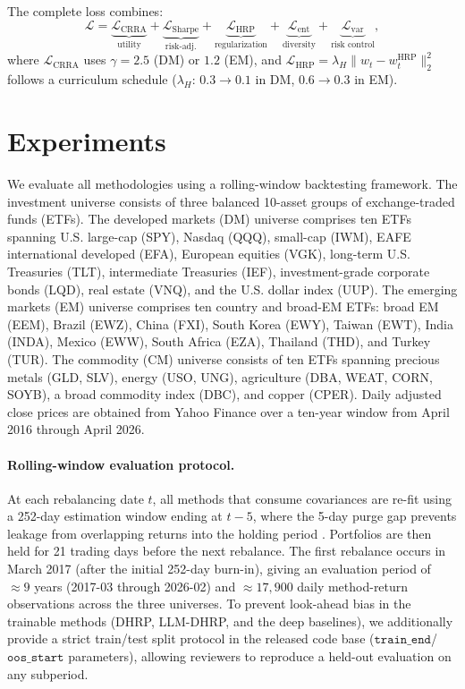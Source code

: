 \documentclass{article}
\begin{document}
The complete loss combines:
\begin{equation}
\mathcal{L} = \underbrace{\mathcal{L}_{\text{CRRA}}}_{\text{utility}} + \underbrace{\mathcal{L}_{\text{Sharpe}}}_{\text{risk-adj.}} + \underbrace{\mathcal{L}_{\text{HRP}}}_{\text{regularization}} + \underbrace{\mathcal{L}_{\text{ent}}}_{\text{diversity}} + \underbrace{\mathcal{L}_{\text{var}}}_{\text{risk control}},
\end{equation}
where $\mathcal{L}_{\text{CRRA}}$ uses $\gamma = 2.5$ (DM) or $1.2$ (EM), and $\mathcal{L}_{\text{HRP}} = \lambda_H \|w_t - w_t^{\text{HRP}}\|_2^2$ follows a curriculum schedule ($\lambda_H$: $0.3 \to 0.1$ in DM, $0.6 \to 0.3$ in EM).

\section{Experiments}

We evaluate all methodologies using a rolling-window backtesting framework. The investment universe consists of three balanced 10-asset groups of exchange-traded funds (ETFs). The developed markets (DM) universe comprises ten ETFs spanning U.S. large-cap (SPY), Nasdaq (QQQ), small-cap (IWM), EAFE international developed (EFA), European equities (VGK), long-term U.S. Treasuries (TLT), intermediate Treasuries (IEF), investment-grade corporate bonds (LQD), real estate (VNQ), and the U.S. dollar index (UUP). The emerging markets (EM) universe comprises ten country and broad-EM ETFs: broad EM (EEM), Brazil (EWZ), China (FXI), South Korea (EWY), Taiwan (EWT), India (INDA), Mexico (EWW), South Africa (EZA), Thailand (THD), and Turkey (TUR). The commodity (CM) universe consists of ten ETFs spanning precious metals (GLD, SLV), energy (USO, UNG), agriculture (DBA, WEAT, CORN, SOYB), a broad commodity index (DBC), and copper (CPER). Daily adjusted close prices are obtained from Yahoo Finance over a ten-year window from April 2016 through April 2026.

\paragraph{Rolling-window evaluation protocol.} At each rebalancing date $t$, all methods that consume covariances are re-fit using a 252-day estimation window ending at $t-5$, where the 5-day purge gap prevents leakage from overlapping returns into the holding period \citep{LopezdePrado2018}. Portfolios are then held for 21 trading days before the next rebalance. The first rebalance occurs in March 2017 (after the initial 252-day burn-in), giving an evaluation period of $\approx 9$ years (2017-03 through 2026-02) and $\approx 17{,}900$ daily method-return observations across the three universes. To prevent look-ahead bias in the trainable methods (DHRP, LLM-DHRP, and the deep baselines), we additionally provide a strict train/test split protocol in the released code base ($\texttt{train\_end}$/$\texttt{oos\_start}$ parameters), allowing reviewers to reproduce a held-out evaluation on any subperiod.
\end{document}
